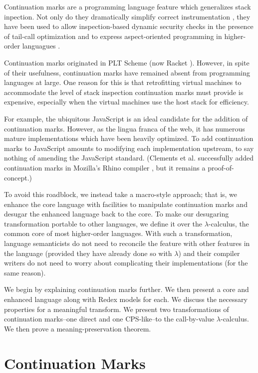 \documentclass{llncs}
\newcommand{\lc}[0]{$\lambda$-calculus}
\begin{document}
Continuation marks \cite{clements2006portable} are a programming language feature which generalizes stack inpection. Not only do they dramatically simplify correct instrumentation \cite{clements2001modeling}, they have been used to allow inspection-based dynamic security checks in the presence of tail-call optimization \cite{clements2004tail} and to express aspect-oriented programming in higher-order languagues \cite{tucker2003pointcuts}.

Continuation marks originated in PLT Scheme (now Racket \cite{plt-tr1}). However, in spite of their usefulness, continuation marks have remained absent from programming languages at large. One reason for this is that retrofitting virtual machines to accommodate the level of stack inspection continuation marks must provide is expensive, especially when the virtual machines use the host stack for efficiency.

For example, the ubiquitous JavaScript is an ideal candidate for the addition of continuation marks. However, as the lingua franca of the web, it has numerous mature implementations which have been heavily optimized. To add continuation marks to JavaScript amounts to modifying each implementation upstream, to say nothing of amending the JavaScript standard. (Clements et al. successfully added continuation marks in Mozilla's Rhino compiler \cite{clements2008implementing}, but it remains a proof-of-concept.)

To avoid this roadblock, we instead take a macro-style approach; that is, we enhance the core language with facilities to manipulate continuation marks and desugar the enhanced language back to the core. To make our desugaring transformation portable to other languages, we define it over the \lc, the common core of most higher-order languages. With such a transformation, language semanticists do not need to reconcile the feature with other features in the language (provided they have already done so with $\lambda$) and their compiler writers do not need to worry about complicating their implementations (for the same reason).

We begin by explaining continuation marks further. We then present a core and enhanced language along with Redex models for each. We discuss the necessary properties for a meaningful transform.  We present two transformations of continuation marks--one direct and one CPS-like--to the call-by-value \lc. We then prove a meaning-preservation theorem.

\section{Continuation Marks}
\end{document}
